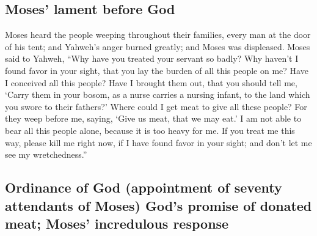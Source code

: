 \hypertarget{moses-lament-before-god}{%
\subsection{Moses' lament before God}\label{moses-lament-before-god}}

 Moses heard the people weeping throughout their
families, every man at the door of his tent; and Yahweh's anger burned
greatly; and Moses was displeased.  Moses said to Yahweh,
``Why have you treated your servant so badly? Why haven't I found favor
in your sight, that you lay the burden of all this people on me?
 Have I conceived all this people? Have I brought them
out, that you should tell me, `Carry them in your bosom, as a nurse
carries a nursing infant, to the land which you swore to their fathers?'
 Where could I get meat to give all these people? For
they weep before me, saying, `Give us meat, that we may eat.'
 I am not able to bear all this people alone, because it
is too heavy for me.  If you treat me this way, please
kill me right now, if I have found favor in your sight; and don't let me
see my wretchedness.''

\hypertarget{ordinance-of-god-appointment-of-seventy-attendants-of-moses-gods-promise-of-donated-meat-moses-incredulous-response}{%
\subsection{Ordinance of God (appointment of seventy attendants of
Moses) God's promise of donated meat; Moses' incredulous
response}\label{ordinance-of-god-appointment-of-seventy-attendants-of-moses-gods-promise-of-donated-meat-moses-incredulous-response}}

